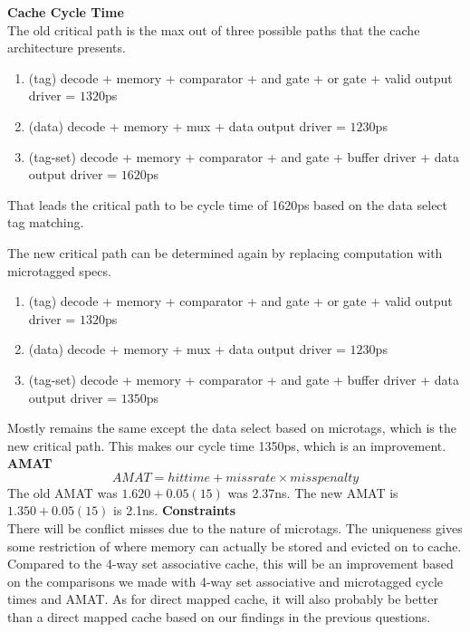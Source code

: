 \documentclass[11pt]{article}
\begin{document}
\begin{Parts}
	\Part \textbf{Cache Cycle Time} \\
	The old critical path is the max out of three possible paths that the cache architecture presents.
	\begin{enumerate}[i]
		\item (tag) decode + memory + comparator + and gate + or gate + valid output driver = $1320$ps
		\item (data) decode + memory + mux + data output driver = $1230$ps
		\item (tag-set) decode + memory + comparator + and gate + buffer driver + data output driver = $1620$ps
	\end{enumerate}

	That leads the critical path to be cycle time of 1620ps based on the data select tag matching.

	The new critical path can be determined again by replacing computation with microtagged specs.
	\begin{enumerate}[i]
		\item (tag) decode + memory + comparator + and gate + or gate + valid output driver = $1320$ps
		\item (data) decode + memory + mux + data output driver = $1230$ps
		\item (tag-set) decode + memory + comparator + and gate + buffer driver + data output driver = $1350$ps
	\end{enumerate}

	Mostly remains the same except the data select based on microtags, which is the new critical path. This makes our cycle time 1350ps, which is an improvement.
	\Part \textbf{AMAT} \\
	$$AMAT = hit time + miss rate \times miss penalty$$
	The old AMAT was $1.620 + 0.05(15)$ was 2.37ns.
	The new AMAT is $1.350 + 0.05(15)$ is 2.1ns.
	\Part \textbf{Constraints} \\
	There will be conflict misses due to the nature of microtags. The uniqueness gives some restriction of where memory can actually be stored and evicted on to cache. Compared to the 4-way set associative cache, this will be an improvement based on the comparisons we made with 4-way set associative and microtagged cycle times and AMAT. As for direct mapped cache, it will also probably be better than a direct mapped cache based on our findings in the previous questions.
\end{Parts}
\newpage

\end{document}
